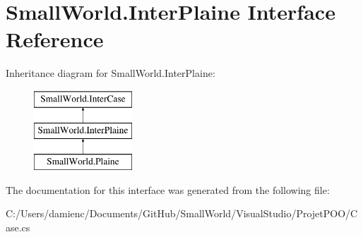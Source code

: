 \hypertarget{interface_small_world_1_1_inter_plaine}{\section{Small\-World.\-Inter\-Plaine Interface Reference}
\label{interface_small_world_1_1_inter_plaine}
}
Inheritance diagram for Small\-World.\-Inter\-Plaine\-:\begin{figure}[H]
\begin{center}
\leavevmode
\includegraphics[height=3.000000cm]{interface_small_world_1_1_inter_plaine}
\end{center}
\end{figure}


The documentation for this interface was generated from the following file\-:\begin{DoxyCompactItemize}
\item 
C\-:/\-Users/damienc/\-Documents/\-Git\-Hub/\-Small\-World/\-Visual\-Studio/\-Projet\-P\-O\-O/Case.\-cs\end{DoxyCompactItemize}
